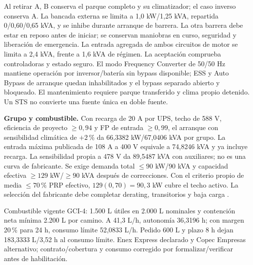 Al retirar A, B conserva el parque completo y su climatizador; el caso inverso conserva A. La bancada externa se limita a 1,0 kW/1,25 kVA, repartida 0/0,60/0,65 kVA, y se inhibe durante arranque de barrera. La otra barrera debe estar en reposo antes de iniciar; se conservan maniobras en curso, seguridad y liberación de emergencia. La entrada agregada de ambos circuitos de motor se limita a 2,4 kVA, frente a 1,6 kVA de régimen. La aceptación comprueba controladoras y estado seguro. El modo Frequency Converter de 50/50 Hz mantiene operación por inversor/batería sin bypass disponible; ESS y Auto Bypass de arranque quedan inhabilitados y el bypass separado abierto y bloqueado. El mantenimiento requiere parque transferido y clima propio detenido. Un STS no convierte una fuente única en doble fuente.

\textbf{Grupo y combustible.} Con recarga de 20 A por UPS, techo de 588 V, eficiencia de proyecto $\geq0,94$ y FP de entrada $\geq0,99$, el arranque con sensibilidad climática de $+2\,\%$ da 66,3382 kW/67,0406 kVA por grupo. La entrada máxima publicada de 108 A a 400 V equivale a 74,8246 kVA y ya incluye recarga. La sensibilidad propia a 478 V da 89,5487 kVA con auxiliares; no es una curva de fabricante. Se exige demanda total $\leq90$ kW/90 kVA y capacidad efectiva $\geq129$ kW/$\geq90$ kVA después de correcciones. Con el criterio propio de media $\leq70\,\%$ PRP efectivo, $129(0,70)=90,3$ kW cubre el techo activo. La selección del fabricante debe completar derating, transitorios y baja carga \parencites{p7-eaton-93t-tecnica}{p7-fg-p200-ficha}.

Combustible vigente GCI-4: 1.500 L útiles en 2.000 L nominales y contención neta mínima 2.200 L por camino. A 41,3 L/h, autonomía 36,3196 h; con margen 20\,\% para 24 h, consumo límite 52,0833 L/h. Pedido 600 L y plazo 8 h dejan 183,3333 L/3,52 h al consumo límite. Enex Express declarado y Copec Empresas alternativo; contrato/cobertura y consumo corregido por formalizar/verificar antes de habilitación.

